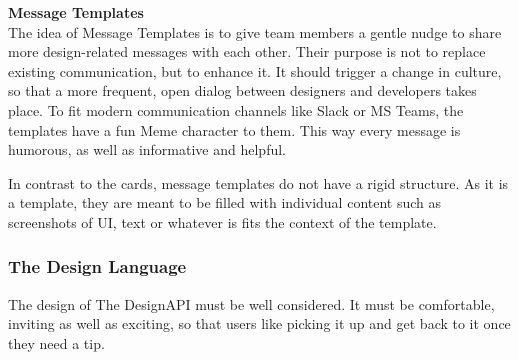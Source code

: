 \textbf{Message Templates}\\
The idea of Message Templates is to give team members a gentle nudge to share more design-related
messages with each other. Their purpose is not to replace existing communication, but to enhance it.
It should trigger a change in culture, so that a more frequent, open dialog between designers and
developers takes place.
To fit modern communication channels like Slack or MS Teams, the templates have a fun Meme character
to them. This way every message is humorous, as well as informative and helpful.

In contrast to the cards, message templates do not have a rigid structure. As it is a template, they
are meant to be filled with individual content such as screenshots of UI, text or whatever is fits
the context of the template.

\subsubsection{The Design Language}


% 


The design of The DesignAPI must be well considered. It must be comfortable, inviting as well as
exciting, so that users like picking it up and get back to it once they need a tip.

